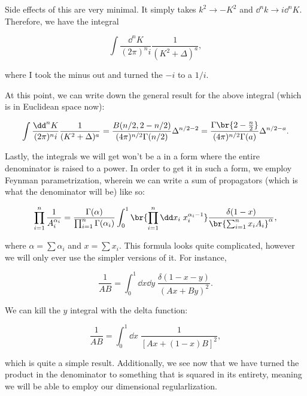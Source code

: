 \documentclass[titlepage]{article}
\begin{document}
Side effects of this are very minimal. It simply takes $k^2 \rightarrow -K^2$ and $\dd^nk \rightarrow i\dd^nK$. Therefore, we have the integral

\begin{equation}
  \int \frac{\dd^nK}{(2\pi)^ni} \frac{1}{(K^2 + \Delta)^a},
\end{equation}

where I took the minus out and turned the $-i$ to a $1/i$.

At this point, we can write down the general result for the above integral (which is in Euclidean space now):

\begin{equation}
  \int \frac{\dd^nK}{(2\pi)^ni} \frac{1}{(K^2 + \Delta)^a} = \frac{B(n/2, 2-n/2)}{(4\pi)^{n/2}\Gamma(n/2)} \Delta^{n/2 - 2} = \frac{\Gamma\br{2 - \frac{n}{2}}}{(4\pi)^{n/2}\Gamma(a)}\Delta^{n/2 - a}.
\end{equation}

Lastly, the integrals we will get won't be a in a form where the entire denominator is raised to a power. In order to get it in such a form, we employ Feynman parametrization, wherein we can write a sum of propagators (which is what the denominator will be) like so:

\begin{equation}
  \prod_{i=1}^n \frac{1}{A_i^{\alpha_i}} = \frac{\Gamma(\alpha)}{\prod_{i=1}^n \Gamma(\alpha_i)} \int_0^1 \br{\prod_{i=1}^n \dd x_i \; x_i^{\alpha_i - 1}} \frac{\delta(1-x)}{\br{\sum_{i=1}^n x_iA_i}^\alpha},
\end{equation}

where $\alpha = \sum \alpha_i$ and $x = \sum x_i$. This formula looks quite complicated, however we will only ever use the simpler versions of it. For instance,

\begin{equation}
  \frac{1}{AB} = \int_0^1\dd x \dd y \; \frac{\delta(1-x-y)}{(Ax + By)^2}.
\end{equation}

We can kill the $y$ integral with the delta function:

\begin{equation}
  \frac{1}{AB} = \int_0^1 \dd x \; \frac{1}{[Ax + (1-x)B]^2},
\end{equation}

which is quite a simple result. Additionally, we see now that we have turned the product in the denominator to something that is squared in its entirety, meaning we will be able to employ our dimensional regularlization.
\end{document}
